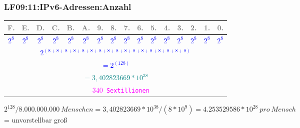 \begin{frame}[fragile]  
  \frametitle{LF09:11:IPv6-Adressen:Anzahl}

  \vspace{0.2cm}
  \begin{tiny}
    
  \begin{center}
    \renewcommand{\arraystretch}{3}
    \begin{tabular}{|c|c|c|c|c|c|c|c|c|c|c|c|c|c|c|c|}
      \hline
      \textcolor{gray}{\tiny{F.}} & \textcolor{gray}{\tiny{E.}} &
        \textcolor{gray}{\tiny{D.}} & \textcolor{gray}{\tiny{C.}} &
          \textcolor{gray}{\tiny{B.}} & \textcolor{gray}{\tiny{A.}} &
            \textcolor{gray}{\tiny{9.}} & \textcolor{gray}{\tiny{8.}} &
              \textcolor{gray}{\tiny{7.}} & \textcolor{gray}{\tiny{6.}} &
                \textcolor{gray}{\tiny{5.}} & \textcolor{gray}{\tiny{4.}} &
                  \textcolor{gray}{\tiny{3.}} & \textcolor{gray}{\tiny{2.}} &
                   \textcolor{gray}{\tiny{1.}} & \textcolor{gray}{\tiny{0.}} \\
      \hline
      \textcolor{blue}{\tiny{$2^8$}} & \textcolor{blue}{\tiny{$2^8$}} &
        \textcolor{blue}{\tiny{$2^8$}} & \textcolor{blue}{\tiny{$2^8$}} &
          \textcolor{blue}{\tiny{$2^8$}} & \textcolor{blue}{\tiny{$2^8$}} &
            \textcolor{blue}{\tiny{$2^8$}} & \textcolor{blue}{\tiny{$2^8$}} &
              \textcolor{blue}{\tiny{$2^8$}} & \textcolor{blue}{\tiny{$2^8$}} &
                \textcolor{blue}{\tiny{$2^8$}} & \textcolor{blue}{\tiny{$2^8$}} &
                  \textcolor{blue}{\tiny{$2^8$}} & \textcolor{blue}{\tiny{$2^8$}} &
                   \textcolor{blue}{\tiny{$2^8$}} & \textcolor{blue}{\tiny{$2^8$}} \\
      \hline
      \multicolumn{16}{|c|}{\footnotesize{\textcolor{blue}{
        \texttt{$2^{(8 + 8 + 8 + 8 + 8 + 8 + 8 + 8 + 8 + 8 + 8 + 8 + 8 + 8 + 8 + 8 + 8)}$}}}} \\
    \hline
    \multicolumn{16}{|c|}{\small{\textcolor{blue}{\texttt{$= 2^{(128)}$}}}} \\
    \hline
    \multicolumn{16}{|c|}{\normalsize{\textcolor{teal}{\texttt{$= 3,402823669*10^{38}$}}}} \\
    \hline
    \multicolumn{16}{|c|}{\normalsize{\textcolor{magenta}{\texttt{ ~ $340$ Sextillionen}}}} \\
    \hline
  \end{tabular}
\end{center}
\end{tiny}

\vspace{0.4cm}
\begin{flushright}
\begin{tiny}
$2^{128} / 8.000.000.000\ Menschen = 3,402823669*10^{38} / (8*10^{9})  = 4.253529586*10^{28}\ pro\ Mensch$ = unvorstellbar groß
\end{tiny}
\end{flushright}

\end{frame}


